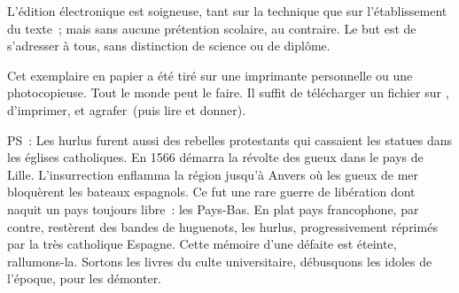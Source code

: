 \documentclass[french,twoside]{book} %
\begin{document}
  L’édition électronique est soigneuse, tant sur la technique
  que sur l’établissement du texte ; mais sans aucune prétention scolaire, au contraire.
  Le but est de s’adresser à tous, sans distinction de science ou de diplôme.
  \par

  Cet exemplaire en papier a été tiré sur une imprimante personnelle
   ou une photocopieuse. Tout le monde peut le faire.
  Il suffit de
  télécharger un fichier sur \href{https://hurlus.fr}{},
  d’imprimer, et agrafer (puis lire et donner).\par

  \bigskip

  \noindent PS : Les hurlus furent aussi des rebelles protestants qui cassaient les statues dans les églises catholiques. En 1566 démarra la révolte des gueux dans le pays de Lille. L’insurrection enflamma la région jusqu’à Anvers où les gueux de mer bloquèrent les bateaux espagnols.
  Ce fut une rare guerre de libération dont naquit un pays toujours libre : les Pays-Bas.
  En plat pays francophone, par contre, restèrent des bandes de huguenots, les hurlus, progressivement réprimés par la très catholique Espagne.
  Cette mémoire d’une défaite est éteinte, rallumons-la. Sortons les livres du culte universitaire, débusquons les idoles de l’époque, pour les démonter.
\fi
\end{document}
